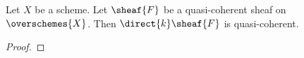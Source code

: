 \begin{lemma}
Let $X$ be a scheme.
Let $\sheaf{F}$ be a quasi-coherent sheaf on $\overschemes{X}$.
Then $\direct{k}\sheaf{F}$ is quasi-coherent.
\end{lemma}

\begin{proof}
\end{proof}
